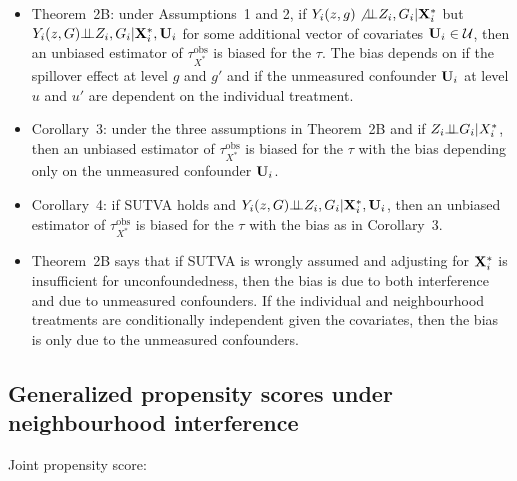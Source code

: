 \documentclass[10pt]{article}
\begin{document}
\begin{itemize}

\item
Theorem~2B: under Assumptions~1 and 2, if $Y_i(z,g)\not{\perp\!\!\!\perp} Z_i,G_i|\mathbf{X}_i^*$ but $Y_i(z,G){\perp\!\!\!\perp} Z_i,G_i|\mathbf{X}_i^*,\mathbf{U}_i$ for some additional vector of covariates $\mathbf{U}_i\in\mathcal{U}$, then an unbiased estimator of $\tau_{X^*}^\text{obs}$ is biased for the $\tau$. The bias depends on if the spillover effect at level $g$ and $g'$ and if the unmeasured confounder $\mathbf{U}_i$ at level $u$ and $u'$ are dependent on the individual treatment.

\item
Corollary~3: under the three assumptions in Theorem~2B and if $Z_i{\perp\!\!\!\perp} G_i|X_i^*$, then an unbiased estimator of $\tau_{X^*}^\text{obs}$ is biased for the $\tau$ with the bias depending only on the unmeasured confounder $\mathbf{U}_i$.

\item
Corollary~4: if SUTVA holds and $Y_i(z,G){\perp\!\!\!\perp} Z_i,G_i|\mathbf{X}_i^*,\mathbf{U}_i$, then an unbiased estimator of $\tau_{X^*}^\text{obs}$ is biased for the $\tau$ with the bias as in Corollary~3.

\item
Theorem~2B says that if SUTVA is wrongly assumed and adjusting for $\mathbf{X}_i^*$ is insufficient for unconfoundedness, then the bias is due to both interference and due to unmeasured confounders. If the individual and neighbourhood treatments are conditionally independent given the covariates, then the bias is only due to the unmeasured confounders.

\end{itemize}

\subsection{Generalized propensity scores under neighbourhood interference}

Joint propensity score:
\end{document}
